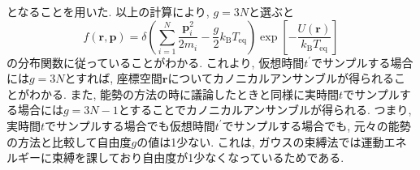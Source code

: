 となることを用いた.
以上の計算により, $g = 3N$と選ぶと
\begin{equation}
    f(\bm{r}, \bm{p})
    =
    \delta
    \left(
        \sum_{i=1}^{N}
        \frac{\bm{p}_{i}^{2}}{2m_{i}}
        -
        \frac{g}{2} k_{\mathrm{B}} T_{\mathrm{eq}}
    \right)
    \exp
    \left[
        - \frac{U(\bm{r})}{k_{\mathrm{B}} T_{\mathrm{eq}}}
    \right]
\end{equation}
の分布関数に従っていることがわかる.
これより, 仮想時間$t^{\prime}$でサンプルする場合には$g = 3N$とすれば, 座標空間$\bm{r}$についてカノニカルアンサンブルが得られることがわかる.
また, 能勢の方法の時に議論したときと同様に実時間$t$でサンプルする場合には$g = 3N-1$とすることでカノニカルアンサンブルが得られる.
つまり, 実時間$t$でサンプルする場合でも仮想時間$t^{\prime}$でサンプルする場合でも, 元々の能勢の方法と比較して自由度$g$の値は1少ない.
これは, ガウスの束縛法では運動エネルギーに束縛を課しており自由度が1少なくなっているためである.

